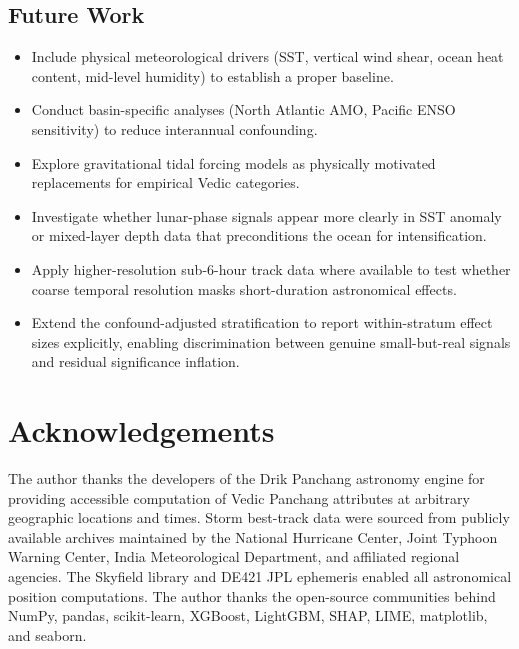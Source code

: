 \documentclass[12pt,a4paper]{article}
\begin{document}
\subsection{Future Work}

\begin{itemize}[noitemsep]
  \item Include physical meteorological drivers (SST, vertical wind shear,
        ocean heat content, mid-level humidity) to establish a proper baseline.
  \item Conduct basin-specific analyses (North Atlantic AMO, Pacific ENSO
        sensitivity) to reduce interannual confounding.
  \item Explore gravitational tidal forcing models as physically motivated
        replacements for empirical Vedic categories.
  \item Investigate whether lunar-phase signals appear more clearly in SST
        anomaly or mixed-layer depth data that preconditions the ocean for
        intensification.
  \item Apply higher-resolution sub-6-hour track data where available to
        test whether coarse temporal resolution masks short-duration
        astronomical effects.
  \item Extend the confound-adjusted stratification to report within-stratum
        effect sizes explicitly, enabling discrimination between genuine
        small-but-real signals and residual significance inflation.
\end{itemize}

\section*{Acknowledgements}

The author thanks the developers of the Drik Panchang astronomy engine for
providing accessible computation of Vedic Panchang attributes at arbitrary
geographic locations and times. Storm best-track data were sourced from
publicly available archives maintained by the National Hurricane Center,
Joint Typhoon Warning Center, India Meteorological Department, and affiliated
regional agencies. The Skyfield library and DE421 JPL ephemeris enabled all
astronomical position computations. The author thanks the open-source
communities behind NumPy, pandas, scikit-learn, XGBoost, LightGBM, SHAP,
LIME, matplotlib, and seaborn.
\end{document}
